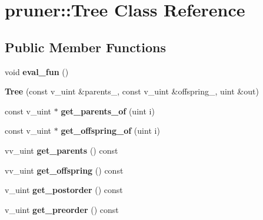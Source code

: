 \hypertarget{classpruner_1_1Tree}{}\section{pruner\+:\+:Tree Class Reference}
\label{classpruner_1_1Tree}
\subsection*{Public Member Functions}
\begin{DoxyCompactItemize}
\item 
void {\bfseries eval\+\_\+fun} ()\hypertarget{classpruner_1_1Tree_abaa9ef6d7eacf37302d29c12c2180c3a}{}\label{classpruner_1_1Tree_abaa9ef6d7eacf37302d29c12c2180c3a}

\item 
{\bfseries Tree} (const v\+\_\+uint \&parents\+\_\+, const v\+\_\+uint \&offspring\+\_\+, uint \&out)\hypertarget{classpruner_1_1Tree_a0f964d9ba9834822d3e18946a5361839}{}\label{classpruner_1_1Tree_a0f964d9ba9834822d3e18946a5361839}

\item 
const v\+\_\+uint $\ast$ {\bfseries get\+\_\+parents\+\_\+of} (uint i)\hypertarget{classpruner_1_1Tree_a63ce508227afee3535e6ebc1bf864ab1}{}\label{classpruner_1_1Tree_a63ce508227afee3535e6ebc1bf864ab1}

\item 
const v\+\_\+uint $\ast$ {\bfseries get\+\_\+offspring\+\_\+of} (uint i)\hypertarget{classpruner_1_1Tree_aa1cb5b73d8071e8c5b8be1ec29b54519}{}\label{classpruner_1_1Tree_aa1cb5b73d8071e8c5b8be1ec29b54519}

\item 
vv\+\_\+uint {\bfseries get\+\_\+parents} () const \hypertarget{classpruner_1_1Tree_af6fc180708707649aea726520e0380dd}{}\label{classpruner_1_1Tree_af6fc180708707649aea726520e0380dd}

\item 
vv\+\_\+uint {\bfseries get\+\_\+offspring} () const \hypertarget{classpruner_1_1Tree_a6e4c504b4cb062572f0e2be0ae9d78f2}{}\label{classpruner_1_1Tree_a6e4c504b4cb062572f0e2be0ae9d78f2}

\item 
v\+\_\+uint {\bfseries get\+\_\+postorder} () const \hypertarget{classpruner_1_1Tree_a6b3a01f3e0b29522341fe5ba59117471}{}\label{classpruner_1_1Tree_a6b3a01f3e0b29522341fe5ba59117471}

\item 
v\+\_\+uint {\bfseries get\+\_\+preorder} () const \hypertarget{classpruner_1_1Tree_a22f81a8b7062b224f13dd1f2e7a1f7e0}{}\label{classpruner_1_1Tree_a22f81a8b7062b224f13dd1f2e7a1f7e0}


\end{DoxyCompactItemize}
